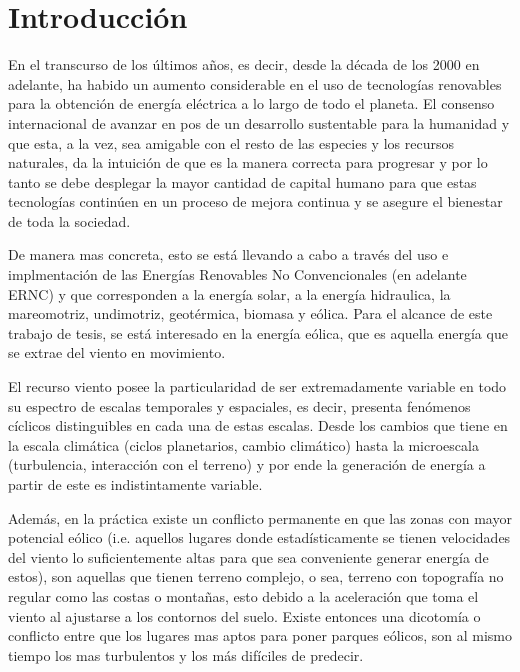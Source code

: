 \chapter{Introducción}
En el transcurso de los últimos años, es decir, desde la década de los 2000 en adelante, ha habido un aumento considerable en el uso de tecnologías renovables para la obtención de energía eléctrica a lo largo de todo el planeta. El consenso internacional de avanzar en pos de un desarrollo sustentable para la humanidad y que esta, a la vez, sea amigable con el resto de las especies y los recursos naturales, da la intuición de que es la manera correcta para progresar y por lo tanto se debe desplegar la mayor cantidad de capital humano para que estas tecnologías continúen en un proceso de mejora continua y se asegure el bienestar de toda la sociedad.

De manera mas concreta, esto se está llevando a cabo a través del uso e implmentación de las Energías Renovables No Convencionales (en adelante ERNC) y que corresponden a la energía solar, a la energía hidraulica, la mareomotriz, undimotriz, geotérmica, biomasa y eólica. Para el alcance de este trabajo de tesis, se está interesado en la energía eólica, que es aquella energía que se extrae del viento en movimiento.

El recurso viento posee la particularidad de ser extremadamente variable en todo su espectro de escalas temporales y espaciales, es decir, presenta fenómenos cíclicos distinguibles en cada una de estas escalas. Desde los cambios que tiene en la escala climática (ciclos planetarios, cambio climático) hasta la microescala (turbulencia, interacción con el terreno) y por ende la generación de energía a partir de este es indistintamente variable. 
 


Además, en la práctica existe un conflicto permanente en que las zonas con mayor potencial eólico (i.e. aquellos lugares donde estadísticamente se tienen velocidades del viento lo suficientemente altas para que sea conveniente generar energía de estos), son aquellas que tienen terreno complejo, o sea, terreno con topografía no regular como las costas o montañas, esto debido a la aceleración que toma el viento al ajustarse a los contornos del suelo. Existe entonces una dicotomía o conflicto entre que los lugares mas aptos para poner parques eólicos, son al mismo tiempo los mas turbulentos y los más difíciles de predecir.

